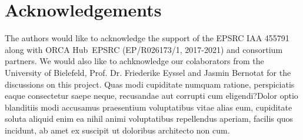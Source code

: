 \documentclass[letterpaper]{article} %
\begin{document}
\section{Acknowledgements}
The authors would like to acknowledge the support of the EPSRC IAA 455791 along with ORCA Hub~EPSRC (EP/R026173/1, 2017-2021) and consortium partners. We would also like to achknowledge our colaborators from the University of Bielefeld, Prof. Dr. Friederike Eyssel and Jasmin Bernotat for the discussions on this project.
  Quas modi cupiditate numquam ratione, perspiciatis eaque consectetur saepe neque, recusandae aut corrupti cum eligendi?Dolor optio blanditiis modi accusamus praesentium voluptatibus vitae alias eum, cupiditate soluta aliquid enim ea nihil animi voluptatibus repellendus aperiam, facilis quos incidunt, ab amet ex suscipit ut doloribus architecto non cum.\clearpage

\end{document}
